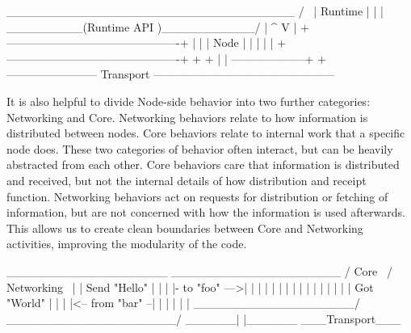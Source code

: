 \begin{verbnobox}[\small]
     __________________________________
    /                                  \
    |            Runtime               |
    |                                  |
    \_________(Runtime API )___________/
                |       ^
                V       |
+----------------------------------------------+
|                                              |
|                   Node                       |
|                                              |
|                                              |
+----------------------------------------------+
                    +  +
                    |  |
--------------------+  +------------------------
                    Transport
------------------------------------------------
\end{verbnobox}

It is also helpful to divide Node-side behavior into two further categories:
Networking and Core. Networking behaviors relate to how information is
distributed between nodes. Core behaviors relate to internal work that a
specific node does. These two categories of behavior often interact, but can be
heavily abstracted from each other. Core behaviors care that information is
distributed and received, but not the internal details of how distribution and
receipt function. Networking behaviors act on requests for distribution or
fetching of information, but are not concerned with how the information is used
afterwards. This allows us to create clean boundaries between Core and
Networking activities, improving the modularity of the code.

\begin{verbnobox}
 ___________________                    ____________________
/       Core        \                  /     Networking     \
|                   |  Send "Hello"    |                    |
|                   |-  to "foo"   --->|                    |
|                   |                  |                    |
|                   |                  |                    |
|                   |                  |                    |
|                   |    Got "World"   |                    |
|                   |<--  from "bar" --|                    |
|                   |                  |                    |
\___________________/                  \____________________/
                                        ______| |______
                                        ___Transport___
\end{verbnobox}

